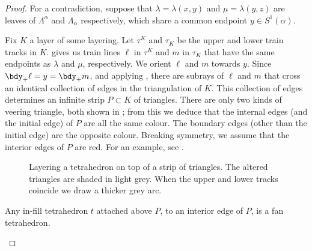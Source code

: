 \documentclass[12pt]{amsart}
\begin{document}
\begin{proof}
For a contradiction, suppose that $\lambda = \lambda(x, y)$ and $\mu = \lambda(y, z)$ are leaves of $\Lambda^\alpha$ and $\Lambda_\alpha$ respectively, which share a common endpoint $y \in S^1(\alpha)$.  

Fix $K$ a layer of some layering.  Let $\tau^K$ and $\tau_K$ be the upper and lower train tracks in $K$.   gives us train lines $\ell$ in $\tau^K$ and $m$ in $\tau_K$ that have the same endpoints as $\lambda$ and $\mu$, respectively.  We orient $\ell$ and $m$ towards $y$.   Since $\bdy_+ \ell = y = \bdy_+ m$, and applying , there are subrays of $\ell$ and $m$ that cross an identical collection of edges in the triangulation of $K$.  This collection of edges determines an infinite strip $P \subset K$ of triangles.  There are only two kinds of veering triangle, both shown in ; from this we deduce that the internal edges (and the initial edge) of $P$ are all the same colour.  The boundary edges (other than the initial edge) are the opposite colour.  Breaking symmetry, we assume that the interior edges of $P$ are red.  For an example, see .  

\begin{figure}[htb]
\centering
{}


\caption{Layering a tetrahedron on top of a strip of triangles. The altered triangles are shaded in light grey. When the upper and lower tracks coincide we draw a thicker grey arc.}
\label{Fig:NoMixedTypeAsymptoticsFigs}
\end{figure}

\begin{claim*}
Any in-fill tetrahedron $t$ attached above $P$, to an interior edge of $P$, is a fan tetrahedron.
\end{claim*}


\end{proof}
\end{document}
